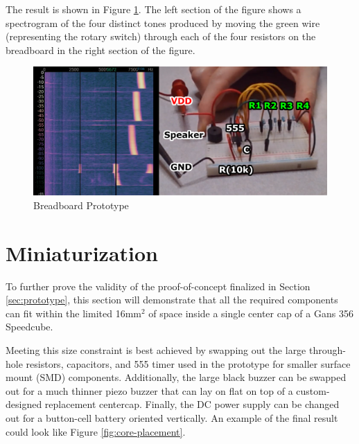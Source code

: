 The result is shown in Figure \ref{fig:breadboard}. The left section of
the figure shows a spectrogram of the four distinct tones produced by
moving the green wire (representing the rotary switch) through each of
the four resistors on the breadboard in the right section of the figure.

\begin{figure}[h]
    \centering
    \caption{Breadboard Prototype}
    \label{fig:breadboard}
    \includegraphics[width=\linewidth]{Figures/6 PCB Design/breadboard_spectrogram.png}
\end{figure}


\section{Miniaturization}
\label{sec:miniaturization}

To further prove the validity of the proof-of-concept finalized in
Section \ref{sec:prototype}, this section will demonstrate that all the
required components can fit within the limited 16mm$^2$ of space inside
a single center cap of a Gans 356 Speedcube.

Meeting this size constraint is best achieved by swapping out the large
through-hole resistors, capacitors, and 555 timer used in the prototype
for smaller surface mount (SMD) components. Additionally, the large
black buzzer can be swapped out for a much thinner piezo buzzer that
can lay on flat on top of a custom-designed replacement centercap.
Finally, the DC power supply can be changed out for a button-cell
battery oriented vertically. An example of the final result could look like Figure \ref{fig:core-placement}.

